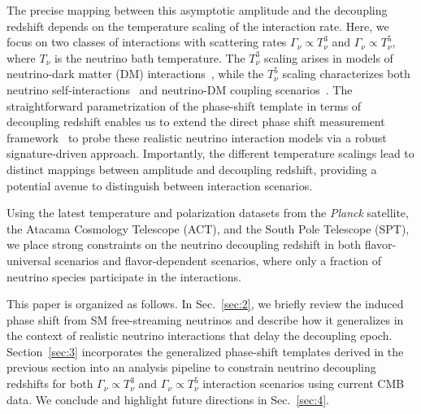 \documentclass[aps,prd,twocolumn,showpacs,superscriptaddress,nofootinbib,preprintnumbers]{revtex4-2}
\begin{document}
The precise mapping between this asymptotic amplitude and the decoupling redshift depends on the temperature scaling of the interaction rate. Here, we focus on two classes of interactions with scattering rates $\Gamma_\nu\propto T_\nu^3$ and $\Gamma_\nu\propto T_\nu^5$, where $T_\nu$ is the neutrino bath temperature. The $T_\nu^3$ scaling arises in models of neutrino-dark matter (DM) interactions~\cite{Boehm:2003hm,Stadler:2019dii,Serra:2009uu,Olivares-DelCampo:2017feq,Ghosh:2017jdy}, while the $T_\nu^5$ scaling characterizes both neutrino self-interactions~\cite{Cyr-Racine:2013jua,Oldengott:2014qra,Oldengott:2017fhy,Kreisch:2019yzn,Das:2020xke,Das:2023npl,RoyChoudhury:2020dmd,Lancaster:2017ksf,Camarena:2023cku,Poudou:2025qcx,He:2023oke,He:2025jwp} and neutrino-DM coupling scenarios~\cite{Wilkinson:2014ksa,Escudero:2015yka,DiValentino:2017oaw,Ghosh:2019tab,Mosbech:2020ahp,He:2025jwp}. The straightforward parametrization of the phase-shift template in terms of decoupling redshift enables us to extend the direct phase shift measurement framework~\cite{Follin:2015hya,Montefalcone:2025unv} to probe these realistic neutrino interaction models via a robust signature-driven approach. Importantly, the different temperature scalings lead to distinct mappings between amplitude and decoupling redshift, providing a potential avenue to distinguish between interaction scenarios.

Using the latest temperature and polarization datasets from the \textit{Planck} satellite, the Atacama Cosmology Telescope (ACT), and the South Pole Telescope (SPT), we place strong constraints on the neutrino decoupling redshift in both flavor-universal scenarios and flavor-dependent scenarios, where only a fraction of neutrino species participate in the interactions.

This paper is organized as follows. In Sec.~\ref{sec:2}, we briefly review the induced phase shift from SM free-streaming neutrinos and describe how it generalizes in the context of realistic neutrino interactions that delay the decoupling epoch. Section~\ref{sec:3} incorporates the generalized phase-shift templates derived in the previous section into an analysis pipeline to constrain neutrino decoupling redshifts for both $\Gamma_\nu \propto T_\nu^3$ and $\Gamma_\nu \propto T_\nu^5$ interaction scenarios using current CMB data. We conclude and highlight future directions in Sec.~\ref{sec:4}.
\end{document}
